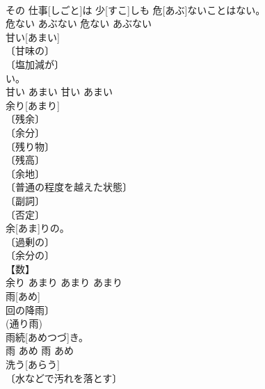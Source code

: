 \documentclass[8pt]{extreport}
\begin{document}
\begin{CJK}{UTF8}{min}
\\	その 仕事[しごと]は 少[すこ]しも 危[あぶ]ないことはない。	
\\	危ない	あぶない	危ない	あぶない	
\\	甘い[あまい]	
\\	〔甘味の〕 
\\	〔塩加減が〕 
\\	[《文》 
\\	〔うっとりと快い〕 
\\	〔おだてるような・誠意のない〕 
\\	《文》 
\\	《文》 
\\	〔言いくるめるような〕 
\\	〔魅力的な〕 
\\	〔甘やかす〕 
\\	〔厳しくない〕 
\\	〔浅薄な〕 
\\	〔のん気な〕 
\\	〔与(くみ)しやすい〕 
\\	〔(野球などで)打ちやすい〕 
\\	〔鋭くない〕 
\\	〔(栓などが)ゆるい〕 
\\	【相場】 
\\	サトウキビは 甘[あま]い。	
\\	甘い	あまい	甘い	あまい	
\\	余り[あまり]	
\\	〔残余〕 
\\	〔余分〕 
\\	〔残り物〕 
\\	〔残高〕 
\\	〔余地〕 
\\	〔普通の程度を越えた状態〕 
\\	〔副詞〕 
\\	〔否定〕 
\\	余[あま]りの。	
\\	〔過剰の〕 
\\	〔余分の〕 
\\	【数】 
\\	余り	あまり	あまり	あまり	
\\	雨[あめ]	
\\	回の降雨〕 
\\	(通り雨) 
\\	雨続[あめつづ]き。	
\\	雨	あめ	雨	あめ	
\\	洗う[あらう]	
\\	〔水などで汚れを落とす〕 

\end{CJK}
\end{document}
